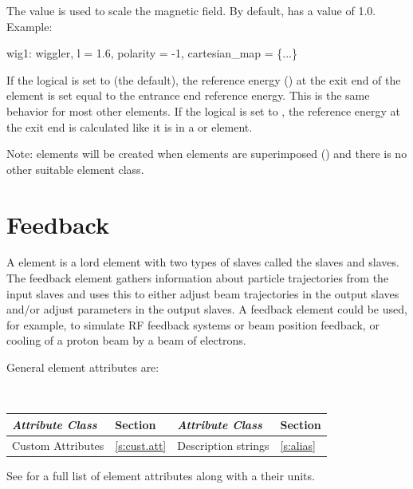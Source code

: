 The  value is used to scale the magnetic field. By
default,  has a value of 1.0.  Example:
\begin{example}
  wig1: wiggler, l = 1.6, polarity = -1, cartesian_map = \{...\}
\end{example}

If the  logical is set to  (the default), the reference energy
() at the exit end of the element is set equal to the entrance end reference
energy. This is the same behavior for most other elements. If the  logical
is set to , the reference energy at the exit end is calculated like it is in a
 or  element.

Note:  elements will be created when elements are superimposed () and
there is no other suitable element class.

\newpage

\section{Feedback}
\label{s:feedback}

A  element is a lord element with two types of slaves called the  slaves and
 slaves.  The feedback element gathers information about particle trajectories from the
input slaves and uses this to either adjust beam trajectories in the output slaves and/or adjust
parameters in the output slaves. A feedback element could be used, for example, to simulate RF feedback
systems or beam position feedback, or cooling of a proton beam by a beam of electrons.

General  element attributes are:
\begin{center}
\tt
\begin{tabular}{llll} \toprule
  {\sl Attribute Class}      & Section           & {\sl Attribute Class}      & Section         \\ \midrule
  Custom Attributes          & \ref{s:cust.att}  & Description strings        & \ref{s:alias}     \\
  \bottomrule
\end{tabular}
\end{center}
\toffset
See  for a full list of element attributes along with a their units.

